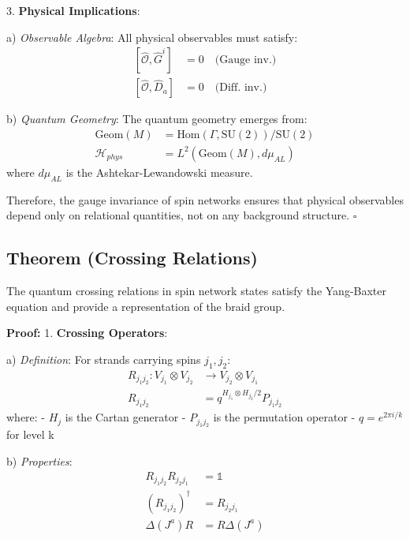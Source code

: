\documentclass[12pt,a4paper]{article}
\begin{document}
3. \textbf{Physical Implications}:
   
   a) \textit{Observable Algebra}:
      All physical observables must satisfy:
      \[
      \begin{aligned}
      [\hat{\mathcal{O}}, \hat{G}^i] &= 0 \quad \text{(Gauge inv.)} \\
      [\hat{\mathcal{O}}, \hat{D}_a] &= 0 \quad \text{(Diff. inv.)}
      \end{aligned}
      \]
   
   b) \textit{Quantum Geometry}:
      The quantum geometry emerges from:
      \[
      \begin{aligned}
      \text{Geom}(M) &= \text{Hom}(\Gamma, \text{SU}(2))/\text{SU}(2) \\
      \mathcal{H}_{phys} &= L^2(\text{Geom}(M), d\mu_{AL})
      \end{aligned}
      \]
      where $d\mu_{AL}$ is the Ashtekar-Lewandowski measure.

Therefore, the gauge invariance of spin networks ensures that physical observables depend only on relational quantities, not on any background structure. $\square$

\subsection{Theorem (Crossing Relations)}
The quantum crossing relations in spin network states satisfy the Yang-Baxter equation and provide a representation of the braid group.

\textbf{Proof:}
1. \textbf{Crossing Operators}:
   
   a) \textit{Definition}:
      For strands carrying spins $j_1, j_2$:
      \[
      \begin{aligned}
      R_{j_1j_2}: V_{j_1} \otimes V_{j_2} &\rightarrow V_{j_2} \otimes V_{j_1} \\
      R_{j_1j_2} &= q^{H_{j_1} \otimes H_{j_2}/2}P_{j_1j_2}
      \end{aligned}
      \]
      where:
      - $H_j$ is the Cartan generator
      - $P_{j_1j_2}$ is the permutation operator
      - $q = e^{2\pi i/k}$ for level k
   
   b) \textit{Properties}:
      \[
      \begin{aligned}
      R_{j_1j_2}R_{j_2j_1} &= \mathbb{1} \\
      (R_{j_1j_2})^\dagger &= R_{j_2j_1} \\
      \Delta(J^a) R &= R \Delta(J^a)
      \end{aligned}
      \]
\end{document}
